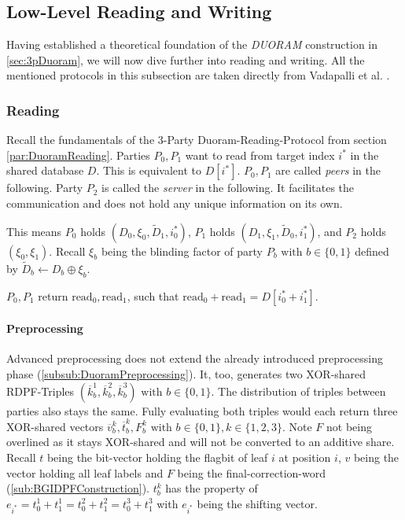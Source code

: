 \subsection{Low-Level Reading and Writing} \label{sub:AdvancedReadingAndWriting}
Having established a theoretical foundation of the \textit{DUORAM} construction in \ref{sec:3pDuoram}, we will now dive further into reading and writing.
All the mentioned protocols in this subsection are taken directly from Vadapalli et al. \cite{vadapalli2023duoram}.

\subsubsection*{Reading}\label{subsub:advancedReading}
Recall the fundamentals of the 3-Party Duoram-Reading-Protocol from section \ref{par:DuoramReading}.
Parties $P_0,P_1$ want to read from target index $i^*$ in the shared database $D$.
This is equivalent to $D[i^*]$.
$P_0,P_1$ are called \textit{peers} in the following.
Party $P_2$ is called the \textit{server} in the following.
It facilitates the communication and does not hold any unique information on its own.

This means $P_0$ holds $(D_0,\xi_0,\widetilde{D}_1,i^*_0)$, $P_1$ holds $(D_1, \xi_1,\widetilde{D}_0,i^*_1)$, and $P_2$ holds $(\xi_0,\xi_1)$.
Recall $\xi_b$ being the blinding factor of party $P_b \text{ with }b\in\{0,1\}$ defined by $\widetilde{D}_b\leftarrow D_b\oplus\xi_b$. 

$P_0,P_1$ return $\text{read}_0,\text{read}_1$, such that $\text{read}_0+\text{read}_1=D[i_0^*+i_1^*]$. 

\paragraph{Preprocessing}\label{par:advancedReadingPreproc}
Advanced preprocessing does not extend the already introduced preprocessing phase (\ref{subsub:DuoramPreprocessing}).
It, too, generates two XOR-shared RDPF-Triples $(\overline{k}_b^1,\overline{k}_b^2,\overline{k}_b^3) \text{ with } b\in\{0,1\}$.
The distribution of triples between parties also stays the same.
Fully evaluating both triples would each return three XOR-shared vectors $\overline{v}_b^k,\overline{t}_b^k,F_b^k \text{ with }b\in\{0,1\},k\in\{1,2,3\}$.
Note $F$ not being overlined as it stays XOR-shared and will not be converted to an additive share.
Recall $t$ being the bit-vector holding the flagbit of leaf $i$ at position $i$, $v$ being the vector holding all leaf labels and $F$ being the final-correction-word (\ref{sub:BGIDPFConstruction}).
$t_b^k$ has the property of $e_{i^*}=t_0^1+t_1^1=t_0^2+t_1^2=t_0^3+t_1^3$ with $e_{i^*}$ being the shifting vector. 


